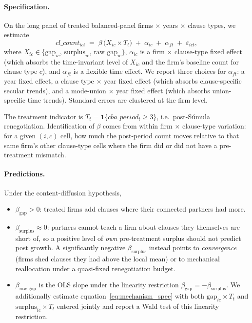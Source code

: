 \paragraph{Specification.} On the long panel of treated balanced-panel
firms $\times$ years $\times$ clause types, we estimate
%
\begin{equation}
  cl\_count_{ict}
  \;=\; \beta \,\bigl(X_{ic} \times T_t\bigr)
  \;+\; \alpha_{ic}
  \;+\; \alpha_{ft}
  \;+\; \varepsilon_{ict},
  \label{eq:mechanism_spec}
\end{equation}
%
where $X_{ic} \in \{\text{gap}_{ic},\, \text{surplus}_{ic},\, \text{raw\_gap}_{ic}\}$,
$\alpha_{ic}$ is a firm $\times$ clause-type fixed effect (which absorbs
the time-invariant level of $X_{ic}$ and the firm's baseline count for
clause type $c$), and $\alpha_{ft}$ is a flexible time effect. We report
three choices for $\alpha_{ft}$: a year fixed effect, a clause type
$\times$ year fixed effect (which absorbs clause-specific secular trends),
and a mode-union $\times$ year fixed effect (which absorbs union-specific
time trends). Standard errors are clustered at the firm level.

The treatment indicator is $T_t = \mathbf{1}\{cba\_period_{t} \geq 3\}$,
i.e.\ post-Súmula renegotiation. Identification of $\beta$ comes from
within firm $\times$ clause-type variation: for a given $(i,c)$ cell, how
much the post-period count moves relative to that same firm's other
clause-type cells where the firm did or did not have a pre-treatment
mismatch.

\paragraph{Predictions.} Under the content-diffusion hypothesis,
%
\begin{itemize}
  \item $\beta_{\text{gap}} > 0$: treated firms add clauses where their
    connected partners had more.
  \item $\beta_{\text{surplus}} \approx 0$: partners cannot teach a firm
    about clauses they themselves are short of, so a positive level of
    \emph{own} pre-treatment surplus should not predict post growth. A
    significantly negative $\beta_{\text{surplus}}$ instead points to
    \emph{convergence} (firms shed clauses they had above the local mean)
    or to mechanical reallocation under a quasi-fixed renegotiation budget.
  \item $\beta_{\text{raw\_gap}}$ is the OLS slope under the linearity
    restriction $\beta_{\text{gap}} = -\beta_{\text{surplus}}$. We
    additionally estimate equation~\eqref{eq:mechanism_spec} with both
    $\text{gap}_{ic} \times T_t$ and $\text{surplus}_{ic} \times T_t$
    entered jointly and report a Wald test of this linearity restriction.
\end{itemize}

